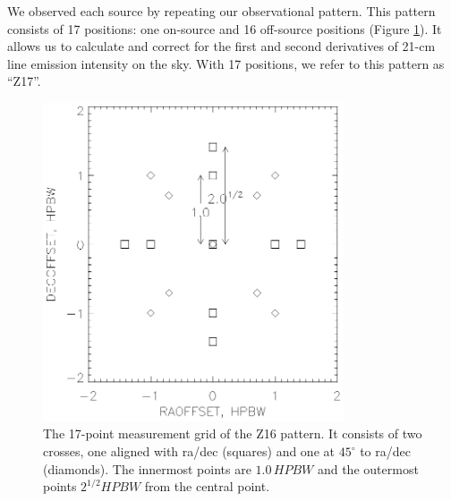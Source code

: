 \documentclass[12pt,preprint]{aastex}
\begin{document}
We observed each source by repeating our observational pattern.  This
pattern consists of 17 positions: one on-source and
16 off-source positions (Figure \ref{crossfig}).  It allows us to
calculate and correct for the first and second derivatives of 21-cm line
emission intensity on the sky. With 17 positions, we refer to
this pattern as ``Z17''.

\begin{figure}[h!]
\begin{center}
\includegraphics[width=3.5in] {f1.ps} 
\end{center}
\caption{The 17-point measurement grid of the Z16 pattern. It consists
of two crosses, one aligned with ra/dec (squares) and one at $45^\circ$
to ra/dec (diamonds).  The innermost points are $1.0 \, H\!P\!B\! W$ and
the outermost points $2^{1/2} H\!P\!B\!W$ from the central point. 
\label{crossfig}} \end{figure}
\end{document}
